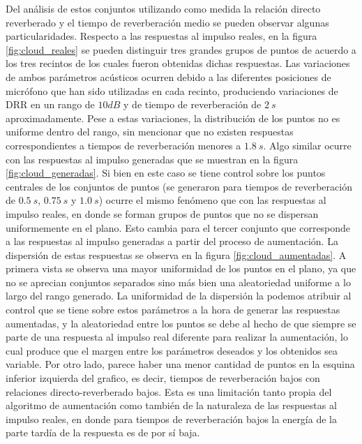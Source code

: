 Del análisis de estos conjuntos utilizando como medida la relación directo reverberado  y el tiempo de reverberación medio se pueden observar algunas particularidades. Respecto a las respuestas al impulso reales, en la figura \ref{fig:cloud_reales} se pueden distinguir tres grandes grupos de puntos de acuerdo a los tres recintos de los cuales fueron obtenidas dichas respuestas. Las variaciones de ambos parámetros acústicos ocurren debido a las diferentes posiciones de micrófono que han sido utilizadas en cada recinto, produciendo variaciones de DRR en un rango de $10 dB$ y de tiempo de reverberación de $2 \ s$ aproximadamente. Pese a estas variaciones, la distribución de los puntos no es uniforme dentro del rango, sin mencionar que no existen respuestas correspondientes a tiempos de reverberación menores a $1.8 \ s$. Algo similar ocurre con las respuestas al impulso generadas que se muestran en la figura \ref{fig:cloud_generadas}. Si bien en este caso se tiene control sobre los puntos centrales de los conjuntos de puntos (se generaron para tiempos de reverberación de $0.5 \ s$, $0.75 \ s$ y $1.0 \ s$) ocurre el mismo fenómeno que con las respuestas al impulso reales, en donde se forman grupos de puntos que no se dispersan uniformemente en el plano. Esto cambia para el tercer conjunto que corresponde a las respuestas al impulso generadas a partir del proceso de aumentación. La dispersión de estas respuestas se observa en la figura \ref{fig:cloud_aumentadas}. A primera vista se observa una mayor uniformidad de los puntos en el plano, ya que no se aprecian conjuntos separados sino más bien una aleatoriedad uniforme a lo largo del rango generado. La uniformidad de la dispersión la podemos atribuir al control que se tiene sobre estos parámetros a la hora de generar las respuestas aumentadas, y la aleatoriedad entre los puntos se debe al hecho de que siempre se parte de una respuesta al impulso real diferente para realizar la aumentación, lo cual produce que el margen entre los parámetros deseados y los obtenidos sea variable. Por otro lado, parece haber una menor cantidad de puntos en la esquina inferior izquierda del grafico, es decir, tiempos de reverberación bajos con relaciones directo-reverberado bajos. Esta es una limitación tanto propia del algoritmo de aumentación como también de la naturaleza de las respuestas al impulso reales, en donde para tiempos de reverberación bajos la energía de la parte tardía de la respuesta es de por sí baja. 




